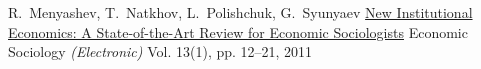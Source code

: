 \begin{cventries}
\end{cventries}



\begin{cventries}

  \cventry
    {R.~Menyashev, T.~Natkhov, L.~Polishchuk, G.~Syunyaev} %
    {\href{https://www.hse.ru/pubs/share/direct/document/59731518}{New Institutional Economics: A State-of-the-Art Review for Economic Sociologists}} %
    {Economic Sociology \emph{(Electronic)}} %
    {Vol. 13(1), pp. 12--21, 2011} %
    {
    }

\end{cventries}

